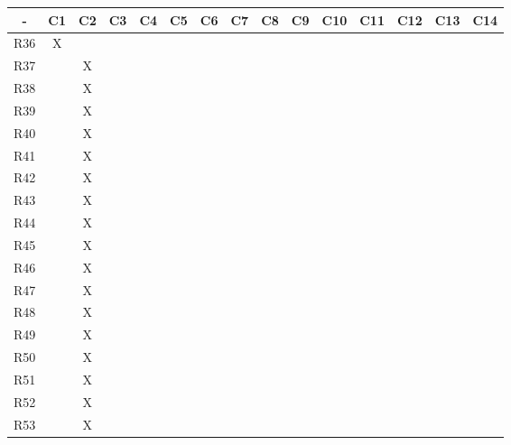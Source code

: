 \begin{table}[]
\begin{tabular}{|c|c|c|c|c|c|c|c|c|c|c|c|c|c|c|}
\hline
-   & C1 & C2 & C3 & C4 & C5 & C6 & C7 & C8 & C9 & C10 & C11 & C12 & C13 & C14 \\ \hline
R36 & X  &    &    &    &    &    &    &    &    &     &     &     &     &     \\ \hline
R37 &    & X  &    &    &    &    &    &    &    &     &     &     &     &     \\ \hline
R38 &    & X  &    &    &    &    &    &    &    &     &     &     &     &     \\ \hline
R39 &    & X  &    &    &    &    &    &    &    &     &     &     &     &     \\ \hline
R40 &    & X  &    &    &    &    &    &    &    &     &     &     &     &     \\ \hline
R41 &    & X  &    &    &    &    &    &    &    &     &     &     &     &     \\ \hline
R42 &    & X  &    &    &    &    &    &    &    &     &     &     &     &     \\ \hline
R43 &    & X  &    &    &    &    &    &    &    &     &     &     &     &     \\ \hline
R44 &    & X  &    &    &    &    &    &    &    &     &     &     &     &     \\ \hline
R45 &    & X  &    &    &    &    &    &    &    &     &     &     &     &     \\ \hline
R46 &    & X  &    &    &    &    &    &    &    &     &     &     &     &     \\ \hline
R47 &    & X  &    &    &    &    &    &    &    &     &     &     &     &     \\ \hline
R48 &    & X  &    &    &    &    &    &    &    &     &     &     &     &     \\ \hline
R49 &    & X  &    &    &    &    &    &    &    &     &     &     &     &     \\ \hline
R50 &    & X  &    &    &    &    &    &    &    &     &     &     &     &     \\ \hline
R51 &    & X  &    &    &    &    &    &    &    &     &     &     &     &     \\ \hline
R52 &    & X  &    &    &    &    &    &    &    &     &     &     &     &     \\ \hline
R53 &    & X  &    &    &    &    &    &    &    &     &     &     &     &     \\ \hline

\end{tabular}
\end{table}
